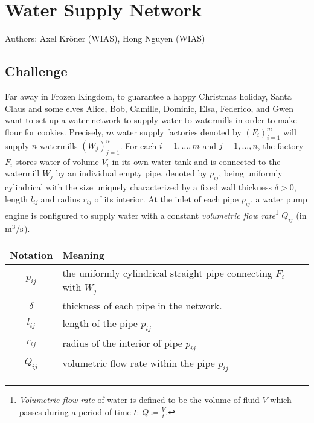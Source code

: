 \documentclass[12pt]{article}
\begin{document}


\section{Water Supply Network}

Authors: Axel Kr\"oner (WIAS), Hong Nguyen (WIAS)

\subsection{Challenge}
Far away in Frozen Kingdom, to guarantee a happy Christmas holiday, Santa Claus and some elves Alice, Bob, Camille, Dominic, Elsa, Federico, and Gwen want to set up a water network to supply water to watermills in order to make flour for cookies. Precisely, $m$ water supply factories denoted by $(F_i)_{i=1}^m$ will supply $n$ watermills $(W_j)_{j=1}^n$. For each $i = 1,\dots,m$ and $j = 1,\ldots,n$, the factory $F_i$ stores water of volume $V_i$ in its own water tank and is connected to the watermill $W_j$ by an individual empty pipe, denoted by $p_{ij}$, being uniformly cylindrical with the size uniquely characterized by a fixed wall thickness $\delta > 0$, length $l_{ij}$ and radius $r_{ij}$ of its interior. At the inlet of each pipe $p_{ij}$, a water pump engine is configured to supply water with a constant \emph{volumetric flow rate}\footnote{\textit{Volumetric flow rate} of water is defined to be the volume of fluid $V$ which passes during a period of time $t$: $Q \coloneqq \frac{V}{t}$.} $Q_{ij}$ (in $\rm m^3/s$).

\begin{table}[h]
    \centering
    \begin{tabular}{|c|l|}
        \hline
        \textbf{Notation} & \textbf{Meaning} \\
        \hline
        $p_{ij}$ & the uniformly cylindrical straight pipe connecting $F_i$ with $W_j$ \\
        \hline
        $\delta$ & thickness of each pipe in the network. \\
        \hline
        $l_{ij}$ & length of the pipe $p_{ij}$ \\
        \hline
        $r_{ij}$ & radius of the interior of pipe $p_{ij}$ \\
        \hline
        $Q_{ij}$ & volumetric flow rate within the pipe $p_{ij}$ \\
        \hline
    \end{tabular}
\end{table}
\end{document}
